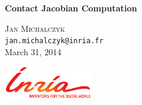 \begin{titlepage}
\begin{center}

{\huge \bfseries Contact Jacobian Computation}

\vspace{2cm} 

\textsc{Jan Michalczyk} \\

\texttt{jan.michalczyk@inria.fr} \\[2cm] 

{March 31, 2014}

\vspace{2cm} 

\includegraphics[width=0.29\textwidth]{INRIA}

\end{center}
\end{titlepage}
